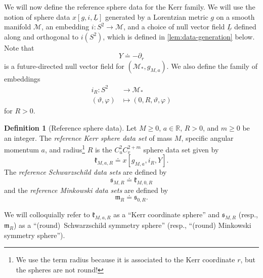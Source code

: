 \documentclass[10pt]{article}
\numberwithin{equation}{section}
\theoremstyle{plain}
\theoremstyle{definition}
\newtheorem{defn}{Definition}[section]
\renewcommand{\Bbb}{\mathbb}
\begin{document}
We will now define the reference sphere data for the Kerr family. We will use the notion of sphere data $x[g,i,\underline L]$ generated by a Lorentzian metric $g$ on a smooth manifold $\mathcal M$, an embedding $i:S^2\to\mathcal M$, and a choice of null vector field $\underline L$ defined along and orthogonal to $i(S^2)$, which is defined in \cref{lem:data-generation} below. Note that
\begin{equation*}
    Y\doteq -\partial_r
\end{equation*}
is a future-directed null vector field for $(\mathcal M_*,g_{M,a})$. We also define the family of embeddings 
\begin{align*}
    i_R:S^2&\to\mathcal M_*\\
   (\vartheta,\varphi) &\mapsto (0,R,\vartheta,\varphi)
\end{align*}
for $R>0$. 
\begin{defn}[Reference sphere data]
    Let $M\ge 0$, $a\in\Bbb R$, $R>0$, and $m\ge 0$ be an integer. The \emph{reference Kerr sphere data set} of mass $M$, specific angular momentum $a$, and radius\footnote{We use the term radius because it is associated to the Kerr coordinate $r$, but the spheres are not round!} $R$ is the $C^2_uC^{2+m}_v$ sphere data set given by 
    \begin{equation}
        \mathfrak k_{M,a,R}\doteq x[g_{M,a},i_R,Y].
    \end{equation}
    The \emph{reference Schwarzschild data sets} are defined by 
    \begin{equation}
        \mathfrak s_{M,R}\doteq \mathfrak k_{M,0,R}
    \end{equation}
    and the \emph{reference Minkowski data sets} are defined by 
    \begin{equation}
        \mathfrak m_R\doteq \mathfrak s_{0,R}. 
    \end{equation}
\end{defn}
We will colloquially refer to $\mathfrak k_{M,a,R}$ as a ``Kerr coordinate sphere'' and $\mathfrak s_{M,R}$ (resp., $\mathfrak m_R$) as a ``(round)~Schwarzschild symmetry sphere'' (resp., ``(round) Minkowski symmetry sphere''). 
\end{document}
